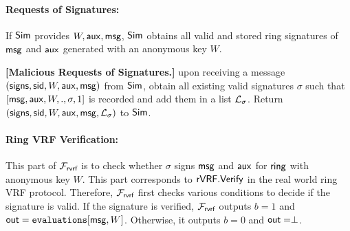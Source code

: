 \paragraph{Requests of  Signatures:} If $ \mathsf{Sim} $ provides $ W, \mathsf{aux}, \mathsf{msg}$, $ \mathsf{Sim} $  obtains all valid and stored ring signatures of $ \mathsf{msg} $ and $ \mathsf{aux} $ generated with an anonymous key $ W $.  

\begin{tcolorbox}[left=2pt,right=2pt]
	\eprint{}{\scriptsize}
	\textbf{[Malicious Requests of  Signatures.]} upon receiving a message $ (\mathsf{signs}, \textsf{sid}, W, \mathsf{aux},\mathsf{msg}) $ from $ \mathsf{Sim} $, obtain all existing valid signatures $ \sigma $ such that $ [\mathsf{msg}, \mathsf{aux},W,.,\sigma, 1] $ is recorded and add them in a list $ {\mathcal{L}}_{\sigma} $. 	Return $ (\mathsf{signs}, \textsf{sid}, W,\mathsf{aux},\mathsf{msg}, {\mathcal{L}}_{\sigma})  $ to $ \mathsf{Sim} $.
\end{tcolorbox}




\paragraph{Ring VRF Verification:} This part of $ \mathcal{F}_{\textsf{rvrf}} $ is to check whether  $ \sigma $ signs $ \mathsf{msg} $ and $ \mathsf{aux} $ for $ \mathsf{ring} $ with anonymous key $ W $. This part corresponds to $ {\mathsf{rVRF}}.{\mathsf{Verify}} $ in the real world ring VRF protocol. Therefore,
$ \mathcal{F}_{\textsf{rvrf}} $ first checks various conditions to decide if the signature is valid. If the signature is verified, $ \mathcal{F}_{\textsf{rvrf}} $ outputs $ b = 1 $ and $ {\mathsf{out}} = \texttt{evaluations}[\mathsf{msg}, W] $. Otherwise, it outputs $ b = 0 $ and $ {\mathsf{out}} = \perp $. 


